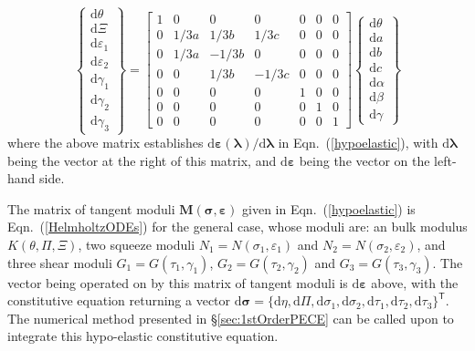 \begin{equation}
    \left\{ \begin{matrix}
    \mathrm{d} \theta \\ \mathrm{d} \Xi \\ \mathrm{d} \varepsilon_1 \\
    \mathrm{d} \varepsilon_2 \\ \mathrm{d} \gamma_1 \\ \mathrm{d} \gamma_2 \\
    \mathrm{d} \gamma_3
    \end{matrix} \right\} = \begin{bmatrix}
    1 & 0 & 0 & 0 & 0 & 0 & 0 \\
    0 & 1/3a & 1/3b & 1/3c & 0 & 0 & 0 \\
    0 & 1/3a & -1/3b & 0 & 0 & 0 & 0 \\
    0 & 0 & 1/3b & -1/3c & 0 & 0 & 0 \\
    0 & 0 & 0 & 0 & 1 & 0 & 0 \\
    0 & 0 & 0 & 0 & 0 & 1 & 0 \\
    0 & 0 & 0 & 0 & 0 & 0 & 1
    \end{bmatrix} \left\{ \begin{matrix}
    \mathrm{d} \theta \\ \mathrm{d} a \\ \mathrm{d} b \\ \mathrm{d} c \\
    \mathrm{d} \alpha \\ \mathrm{d} \beta \\ \mathrm{d} \gamma
    \end{matrix} \right\}
\end{equation}
where the above matrix establishes $\mathrm{d} \boldsymbol{\varepsilon} ( \boldsymbol{\lambda} ) / \mathrm{d} \boldsymbol{\lambda}$ in Eqn.~(\ref{hypoelastic}), with $\mathrm{d} \boldsymbol{\lambda}$ being the vector at the right of this matrix, and $\mathrm{d} \boldsymbol{\varepsilon}$ being the vector on the left-hand side. 

The matrix of tangent moduli $\mathbf{M} ( \boldsymbol{\sigma} , \boldsymbol{\varepsilon} )$ given in Eqn.~(\ref{hypoelastic}) is Eqn.~(\ref{HelmholtzODEs}) for the general case, whose moduli are: an bulk modulus $K(\theta , \Pi , \Xi)$, two squeeze moduli $N_1 = N ( \sigma_1 , \varepsilon_1 )$ and $N_2 = N ( \sigma_2 , \varepsilon_2 )$, and three shear moduli $G_1 = G ( \tau_1 , \gamma_1 )$, $G_2 = G ( \tau_2 , \gamma_2 )$ and $G_3 = G ( \tau_3 , \gamma_3 )$.  The vector being operated on by this matrix of tangent moduli is $\mathrm{d} \boldsymbol{\varepsilon}$ above, with the constitutive equation returning a vector $\mathrm{d} \boldsymbol{\sigma} = \{ \mathrm{d} \eta , \mathrm{d} \Pi , \mathrm{d} \sigma_1 , \mathrm{d} \sigma_2 , \mathrm{d} \tau_1 , \mathrm{d} \tau_2 , \mathrm{d} \tau_3 \}^{\mathsf{T}}$.  The numerical method presented in \S\ref{sec:1stOrderPECE} can be called upon to integrate this hypo-elastic constitutive equation.  

